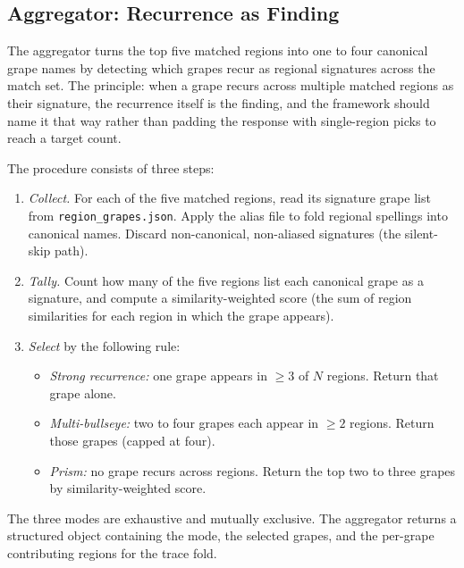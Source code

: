 \documentclass[11pt]{article}
\begin{document}
\subsection{Aggregator: Recurrence as Finding}
The aggregator turns the top five matched regions into one to four canonical grape names by detecting which grapes recur as regional signatures across the match set. The principle: when a grape recurs across multiple matched regions as their signature, the recurrence itself is the finding, and the framework should name it that way rather than padding the response with single-region picks to reach a target count.

The procedure consists of three steps:

\begin{enumerate}[leftmargin=2em,itemsep=0.1em]
\item \emph{Collect.} For each of the five matched regions, read its signature grape list from \texttt{region\_grapes.json}. Apply the alias file to fold regional spellings into canonical names. Discard non-canonical, non-aliased signatures (the silent-skip path).
\item \emph{Tally.} Count how many of the five regions list each canonical grape as a signature, and compute a similarity-weighted score (the sum of region similarities for each region in which the grape appears).
\item \emph{Select} by the following rule:
\begin{itemize}[leftmargin=1.5em,itemsep=0em]
\item \emph{Strong recurrence:} one grape appears in $\geq 3$ of $N$ regions. Return that grape alone.
\item \emph{Multi-bullseye:} two to four grapes each appear in $\geq 2$ regions. Return those grapes (capped at four).
\item \emph{Prism:} no grape recurs across regions. Return the top two to three grapes by similarity-weighted score.
\end{itemize}
\end{enumerate}

The three modes are exhaustive and mutually exclusive. The aggregator returns a structured object containing the mode, the selected grapes, and the per-grape contributing regions for the trace fold.
\end{document}
